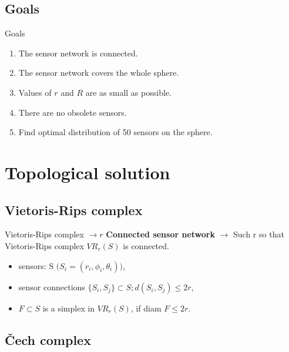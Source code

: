\documentclass{beamer}
\begin{document}
\subsection{Goals}
\begin{frame}{Goals}{}

\begin{enumerate}
	\item {The sensor network is connected.}
	\item {The sensor network covers the whole sphere.}
	\item {Values of $r$ and $R$ are as small as possible.}
	\item {There are no obsolete sensors.}
	\item {Find optimal distribution of 50 sensors on the sphere.}
\end{enumerate}

\end{frame}

\section{Topological solution}

\subsection{Vietoris-Rips complex}

\begin{frame}{Vietoris-Rips complex $\longrightarrow r$}{}
\textbf{Connected sensor network} $\longrightarrow$ Such r so that Vietoris-Rips complex $VR_r(S)$ is connected.
  \begin{itemize}
  	\item {sensors: S $\big(S_i = (r_i, \phi_i, \theta_i)\big)$,}
  	\item {sensor connections $\{S_i, S_j\} \subset S; d(S_i, S_j) \leq 2r$,}
  	\item {$F \subset S$ is a simplex in $VR_r(S)$, if diam $F \leq 2r$}.
  \end{itemize}
\end{frame}
\subsection{Čech complex}
\end{document}
